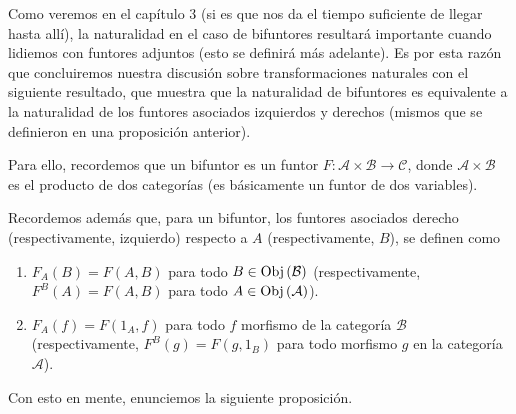 \documentclass[12pt]{report}
\theoremstyle{largebreak}
\newcommand\cf[3]{\ensuremath{#1:#2\rightarrow#3}}
\newcommand{\Obj}[1]{\ensuremath{\textup{Obj}\left(#1\right)}}
\begin{document}
    Como veremos en el capítulo 3 (si es que nos da el tiempo suficiente de llegar hasta allí), la naturalidad en el caso de bifuntores resultará importante cuando lidiemos con funtores adjuntos (esto se definirá más adelante). Es por esta razón que concluiremos nuestra discusión sobre transformaciones naturales con el siguiente resultado, que muestra que la naturalidad de bifuntores es equivalente a la naturalidad de los funtores asociados izquierdos y derechos (mismos que se definieron en una proposición anterior).

    Para ello, recordemos que un bifuntor es un funtor $\cf{F}{\mathcal{A}\times\mathcal{B}}{\mathcal{C}}$, donde $\mathcal{A}\times\mathcal{B}$ es el producto de dos categorías (es básicamente un funtor de dos variables).

    Recordemos además que, para un bifuntor, los funtores asociados derecho (respectivamente, izquierdo) respecto a $A$ (respectivamente, $B$), se definen como
    \begin{enumerate}
        \item $F_A(B)=F(A,B)$ para todo $B\in\Obj{\mathcal{B}}$ (respectivamente, $F^B(A)=F(A,B)$ para todo $A\in\Obj{\mathcal{A}}$).
        \item $F_A(f)=F(1_A,f)$ para todo $f$ morfismo de la categoría $\mathcal{B}$ (respectivamente, $F^B(g)=F(g,1_B)$ para todo morfismo $g$ en la categoría $\mathcal{A}$).
    \end{enumerate}

    Con esto en mente, enunciemos la siguiente proposición.
\end{document}
